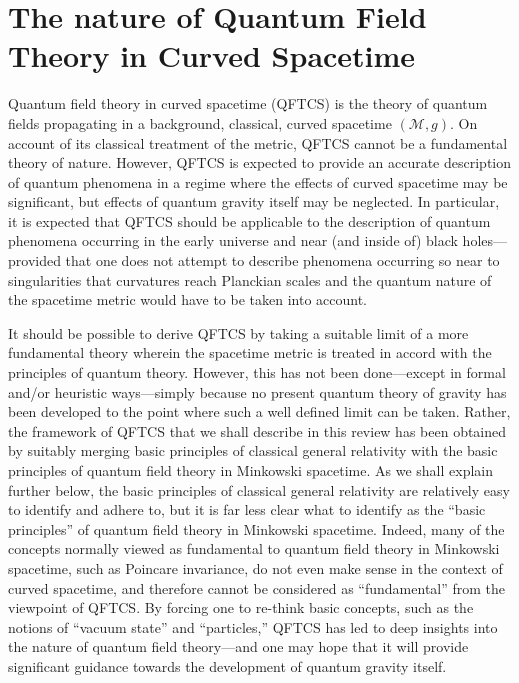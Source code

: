 \documentclass[12pt]{article}
\newcommand{\M}{\mathscr{M}}
\theoremstyle{plain}
\theoremstyle{definition}
\begin{document}
\section{The nature of Quantum Field Theory in Curved Spacetime}

Quantum field theory in curved spacetime (QFTCS) is the theory of quantum fields propagating in a background,
classical, curved spacetime $(\M, g)$. On account of its classical treatment of the metric, QFTCS cannot be a fundamental theory of nature. However, QFTCS is expected to provide an accurate description of quantum phenomena in a regime where the effects of curved spacetime may be significant, but effects of quantum gravity itself may be neglected. In particular, it is expected that QFTCS should be applicable to the description of quantum phenomena occurring  in the early universe and near (and inside of) black holes---provided that one does not attempt to describe phenomena occurring so near to singularities that curvatures reach Planckian scales and the quantum nature of the spacetime metric would have to be taken into account.

It should be possible to derive QFTCS by taking a suitable limit of a more fundamental theory wherein the spacetime metric is treated in accord with the principles of quantum theory. However, this has not been done---except in formal and/or heuristic ways---simply because no present quantum theory of gravity has been developed to the point where such a well defined limit can be taken. Rather, the framework of QFTCS that we shall describe in this review has been obtained by suitably merging basic principles of classical general relativity with the basic principles of quantum field theory in Minkowski spacetime. As we shall explain further below, the basic principles of classical general relativity are relatively easy to identify and adhere to, but it is far less clear what to identify as the ``basic principles'' of quantum field theory in Minkowski spacetime. Indeed, many of the concepts normally viewed as fundamental to quantum field theory in Minkowski spacetime, such as Poincare invariance, do not even make sense in the context of curved spacetime, and therefore cannot be considered as ``fundamental'' from the viewpoint of QFTCS. By forcing one to re-think basic concepts, such as the notions of ``vacuum state'' and ``particles,'' QFTCS has led to deep insights into the nature of quantum field theory---and one may hope that it will provide significant guidance towards the development of quantum gravity itself.
\end{document}
